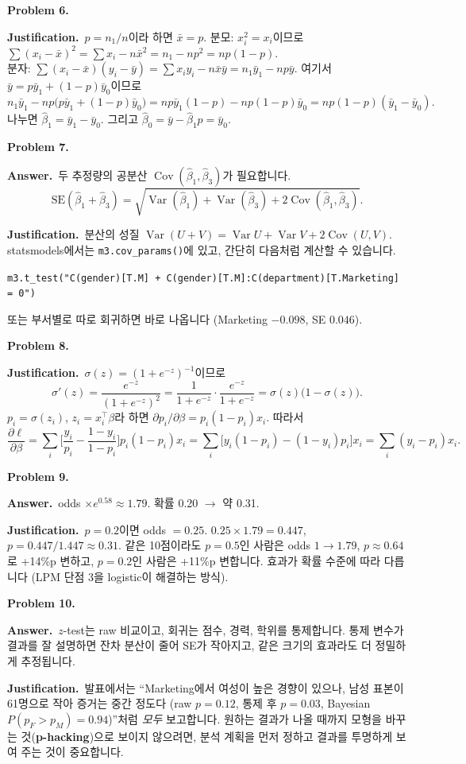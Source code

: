 \documentclass[11pt,a4paper]{article}
\newcommand{\Var}{\operatorname{Var}}
\newcommand{\Cov}{\operatorname{Cov}}
\newcommand{\term}[1]{\textbf{#1}}
\newcommand{\code}[1]{\texttt{#1}}
\newcommand{\Ans}{\par\textbf{Answer.}\ }
\newcommand{\Just}{\par\textbf{Justification.}\ }
\begin{document}
\textbf{Problem 6.}
\Just $p=n_1/n$이라 하면 $\bar x=p$. 분모: $x_i^2=x_i$이므로 $\sum(x_i-\bar x)^2=\sum x_i-n\bar x^2=n_1-n p^2=np(1-p)$.\\
분자: $\sum(x_i-\bar x)(y_i-\bar y)=\sum x_iy_i-n\bar x\bar y=n_1\bar y_1-np\bar y$. 여기서 $\bar y=p\bar y_1+(1-p)\bar y_0$이므로
\[
n_1\bar y_1-np\big(p\bar y_1+(1-p)\bar y_0\big)=np\bar y_1(1-p)-np(1-p)\bar y_0=np(1-p)(\bar y_1-\bar y_0).
\]
나누면 $\hat\beta_1=\bar y_1-\bar y_0$. 그리고 $\hat\beta_0=\bar y-\hat\beta_1p=\bar y_0$.

\textbf{Problem 7.}
\Ans 두 추정량의 공분산 $\Cov(\hat\beta_1,\hat\beta_3)$가 필요합니다.
\[
\mathrm{SE}(\hat\beta_1+\hat\beta_3)=\sqrt{\Var(\hat\beta_1)+\Var(\hat\beta_3)+2\Cov(\hat\beta_1,\hat\beta_3)}.
\]
\Just 분산의 성질 $\Var(U+V)=\Var U+\Var V+2\Cov(U,V)$. statsmodels에서는 \code{m3.cov\_params()}에 있고, 간단히 다음처럼 계산할 수 있습니다.
\begin{center}\small\code{m3.t\_test("C(gender)[T.M] + C(gender)[T.M]:C(department)[T.Marketing] = 0")}\end{center}
 또는 부서별로 따로 회귀하면 바로 나옵니다 (Marketing $-0.098$, SE $0.046$).

\textbf{Problem 8.}
\Just $\sigma(z)=(1+e^{-z})^{-1}$이므로
\[
\sigma'(z)=\frac{e^{-z}}{(1+e^{-z})^2}=\frac1{1+e^{-z}}\cdot\frac{e^{-z}}{1+e^{-z}}=\sigma(z)\big(1-\sigma(z)\big).
\]
$p_i=\sigma(z_i)$, $z_i=x_i^\top\beta$라 하면 $\partial p_i/\partial\beta=p_i(1-p_i)x_i$. 따라서
\[
\frac{\partial\ell}{\partial\beta}=\sum_i\Big[\frac{y_i}{p_i}-\frac{1-y_i}{1-p_i}\Big]p_i(1-p_i)x_i=\sum_i\big[y_i(1-p_i)-(1-y_i)p_i\big]x_i=\sum_i(y_i-p_i)x_i.
\]

\textbf{Problem 9.}
\Ans odds $\times e^{0.58}\approx1.79$. 확률 0.20 $\to$ 약 0.31.
\Just $p=0.2$이면 odds $=0.25$. $0.25\times1.79=0.447$, $p=0.447/1.447\approx0.31$. 같은 10점이라도 $p=0.5$인 사람은 odds $1\to1.79$, $p\approx0.64$로 +14\%p 변하고, $p=0.2$인 사람은 +11\%p 변합니다. 효과가 확률 수준에 따라 다릅니다 (LPM 단점 3을 logistic이 해결하는 방식).

\textbf{Problem 10.}
\Ans $z$-test는 raw 비교이고, 회귀는 점수, 경력, 학위를 통제합니다. 통제 변수가 결과를 잘 설명하면 잔차 분산이 줄어 SE가 작아지고, 같은 크기의 효과라도 더 정밀하게 추정됩니다.
\Just 발표에서는 ``Marketing에서 여성이 높은 경향이 있으나, 남성 표본이 61명으로 작아 증거는 중간 정도다 (raw $p=0.12$, 통제 후 $p=0.03$, Bayesian $P(p_F>p_M)=0.94$)''처럼 \emph{모두} 보고합니다. 원하는 결과가 나올 때까지 모형을 바꾸는 것(\term{p-hacking})으로 보이지 않으려면, 분석 계획을 먼저 정하고 결과를 투명하게 보여 주는 것이 중요합니다.
\end{document}
